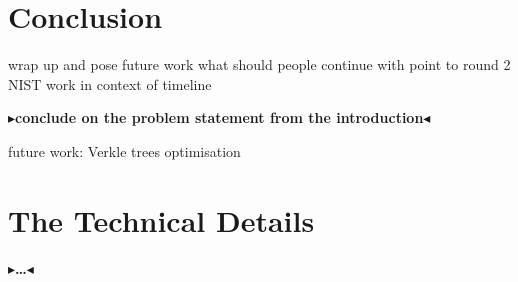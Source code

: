 \documentclass[twoside,11pt,openright]{report}
\theoremstyle{definition}
\theoremstyle{plain}
\newcommand{\todo}[1]{{\color[rgb]{.5,0,0}\textbf{$\blacktriangleright$#1$\blacktriangleleft$}}}
\begin{document}

\chapter{Conclusion}\label{ch:conclusion}

wrap up and pose future work
what should people continue with
point to round 2 NIST
work in context of timeline

\todo{conclude on the problem statement from the introduction}

future work: Verkle trees optimisation


\cleardoublepage
{}




\cleardoublepage
\appendix
\chapter{The Technical Details}

\todo{\dots}
\end{document}

